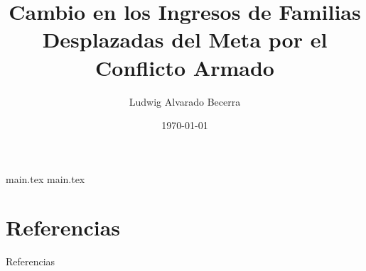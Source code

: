\documentclass[17pt, t, lualatex]{beamer}
\title{\LARGE Cambio en los Ingresos de Familias Desplazadas del Meta por el Conflicto Armado}
\date{\today}
\institute[UJTL]{Universidad Jorge Tadeo Lozano}
\author{Ludwig Alvarado Becerra}
\begin{document}




{main.tex}
{main.tex}

\section{Referencias}

\insertsectionpage
\begin{frame}[allowframebreaks]{Referencias}
  \printbibliography
\end{frame}


\insertendpage
\end{document}

